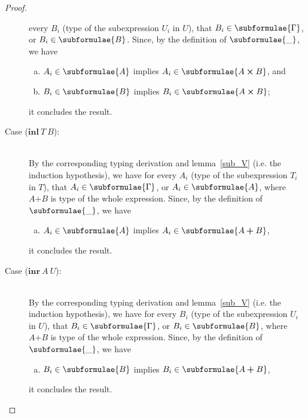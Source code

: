 \documentclass[a4paper]{article}
\newcommand{\typprd}[2]{#1\boldsymbol{\times}#2}
\newcommand{\typsum}[2]{#1\boldsymbol{+}#2}
\newcommand{\explft}[2]{\mathbf{inl}\ #1\ #2}
\newcommand{\exprgt}[2]{\mathbf{inr}\ #1\ #2}
\begin{document}
\begin{proof}
\begin{description}
  every $B_i$ (type of the subexpression $U_i$ in $U$), that $B_i \in
  \subformulae{\Gamma}$, or $B_i \in \subformulae{B}$. Since, by the
  definition of $\subformulae{\_}$, we have
  \begin{enumerate}[(a)] 
     \item $A_i \in \subformulae{A}$ implies $A_i \in \subformulae{\typprd{A}{B}}$, and
     \item $B_i \in \subformulae{B}$ implies $B_i \in \subformulae{\typprd{A}{B}}$;
  \end{enumerate}
  it concludes the result.
\item[Case ($\explft{T}{B}$):]\ \\
  By the corresponding typing derivation and lemma~\ref{sub_V}
  (i.e. the induction hypothesis), we have for every $A_i$ (type of
  the subexpression $T_i$ in $T$), that $A_i \in
  \subformulae{\Gamma}$, or $A_i \in \subformulae{A}$,
  where $\typsum{A}{B}$ is type of the whole expression.
  Since, by the definition of $\subformulae{\_}$, we have
  \begin{enumerate}[(a)] 
     \item $A_i \in \subformulae{A}$ implies $A_i \in \subformulae{\typsum{A}{B}}$,
  \end{enumerate}
  it concludes the result. 
\item[Case ($\exprgt{A}{U}$):]\ \\
  By the corresponding typing derivation and lemma~\ref{sub_V}
  (i.e. the induction hypothesis), we have for every $B_i$ (type of
  the subexpression $U_i$ in $U$), that $B_i \in
  \subformulae{\Gamma}$, or $B_i \in \subformulae{B}$,
  where $\typsum{A}{B}$ is type of the whole expression.
  Since, by the definition of $\subformulae{\_}$, we have
  \begin{enumerate}[(a)] 
     \item $B_i \in \subformulae{B}$ implies $B_i \in \subformulae{\typsum{A}{B}}$,
  \end{enumerate}
  it concludes the result.
\end{description}
\end{proof}
\end{document}

